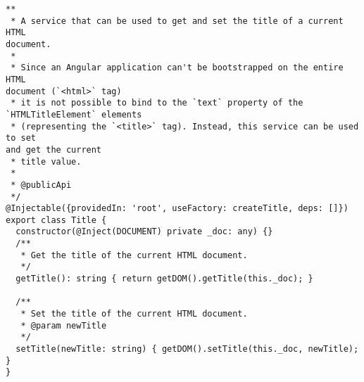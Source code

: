 \begin{verbatim}
**
 * A service that can be used to get and set the title of a current HTML
document.
 *
 * Since an Angular application can't be bootstrapped on the entire HTML
document (`<html>` tag)
 * it is not possible to bind to the `text` property of the
`HTMLTitleElement` elements
 * (representing the `<title>` tag). Instead, this service can be used to set
and get the current
 * title value.
 *
 * @publicApi
 */
@Injectable({providedIn: 'root', useFactory: createTitle, deps: []})
export class Title {
  constructor(@Inject(DOCUMENT) private _doc: any) {}
  /**
   * Get the title of the current HTML document.
   */
  getTitle(): string { return getDOM().getTitle(this._doc); }

  /**
   * Set the title of the current HTML document.
   * @param newTitle
   */
  setTitle(newTitle: string) { getDOM().setTitle(this._doc, newTitle); }
}
\end{verbatim}
